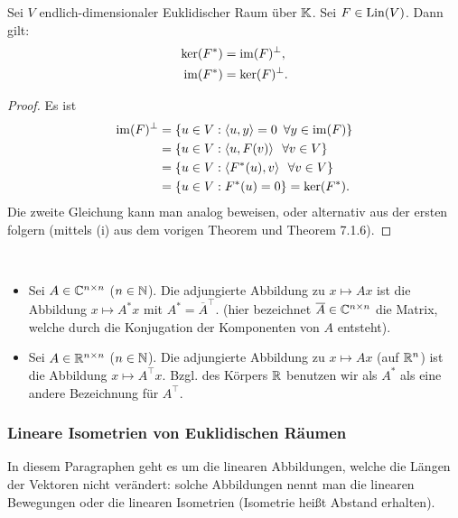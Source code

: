\begin{propn}
	Sei $ V $ endlich-dimensionaler Euklidischer Raum über $ \mathbb K $. Sei $ F \in \operatorname{Lin}(V) $. Dann gilt:
	\begin{align*}
		\ker(F^\ast) &= \operatorname{im}(F)^\bot, \\
		\operatorname{im}(F^\ast) &= \ker(F)^\bot.
	\end{align*}
\end{propn}
\begin{proof}
	Es ist
	\begin{align*}
		 \operatorname{im}(F)^\bot &= \left\{ u \in V : \left\langle u,y \right\rangle = 0 \enspace \forall y \in \operatorname{im}(F) \right\} \\
		 &= \left\{ u \in V : \left\langle u, F(v) \right\rangle \enspace \forall v \in V \right\} \\
		 &= \left\{ u \in V : \left\langle F^\ast(u), v \right\rangle \enspace \forall v \in V \right\} \\
		 &= \left\{ u \in V : F^\ast(u) = 0 \right\} = \ker(F^\ast).
	\end{align*}
	Die zweite Gleichung kann man analog beweisen, oder alternativ aus der ersten folgern (mittels (i) aus dem vorigen Theorem und Theorem 7.1.6). %
\end{proof}

\begin{bem}\
	\begin{itemize}
		\item
			Sei $ A \in \mathbb C^{n \times n} $ ($ n \in \mathbb N $). Die adjungierte Abbildung zu $ x \mapsto Ax $ ist die Abbildung $ x \mapsto A^\ast x $ mit $ A^\ast = \overline{A}^\top $. (hier bezeichnet $ \overline{A} \in \mathbb C^{n \times n}$ die Matrix,  welche durch die Konjugation der Komponenten von $A$ entsteht).
		\item
			Sei $ A \in \mathbb R^{n \times n} $ ($ n \in \mathbb N $). Die adjungierte Abbildung zu $ x \mapsto Ax $ (auf $ \mathbb R^n $) ist die Abbildung $ x \mapsto A^\top x $. Bzgl. des Körpers $\mathbb R$ benutzen wir als $A^\ast$ als eine andere Bezeichnung für $A^\top$. 
	\end{itemize}
\end{bem}

\subsubsection{Lineare Isometrien von Euklidischen Räumen}

In diesem Paragraphen geht es um die linearen Abbildungen, welche die Längen der Vektoren nicht verändert: solche Abbildungen nennt man die linearen Bewegungen oder die linearen Isometrien (Isometrie heißt Abstand erhalten). 

